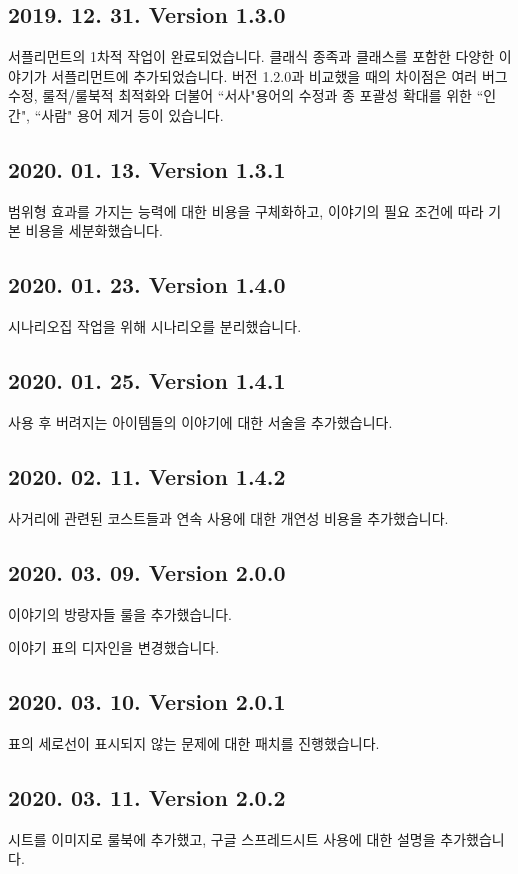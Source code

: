 \documentclass{report}
\begin{document}
	\subsection*{2019. 12. 31. Version 1.3.0}
	서플리먼트의 1차적 작업이 완료되었습니다. 클래식 종족과 클래스를 포함한 다양한 이야기가 서플리먼트에 추가되었습니다. 버전 1.2.0과 비교했을 때의 차이점은 여러 버그 수정, 룰적/룰북적 최적화와 더불어 ``서사"용어의 수정과 종 포괄성 확대를 위한 ``인간", ``사람" 용어 제거 등이 있습니다.
	
	\subsection*{2020. 01. 13. Version 1.3.1}
	범위형 효과를 가지는 능력에 대한 비용을 구체화하고, 이야기의 필요 조건에 따라 기본 비용을 세분화했습니다.
	
	\subsection*{2020. 01. 23. Version 1.4.0}
	시나리오집 작업을 위해 시나리오를 분리했습니다.
	
	\subsection*{2020. 01. 25. Version 1.4.1}
	사용 후 버려지는 아이템들의 이야기에 대한 서술을 추가했습니다.
	
	\subsection*{2020. 02. 11. Version 1.4.2}
	사거리에 관련된 코스트들과 연속 사용에 대한 개연성 비용을 추가했습니다.
	
	\subsection*{2020. 03. 09. Version 2.0.0}
	이야기의 방랑자들 룰을 추가했습니다.
	
	이야기 표의 디자인을 변경했습니다.
	
	\subsection*{2020. 03. 10. Version 2.0.1}
	표의 세로선이 표시되지 않는 문제에 대한 패치를 진행했습니다.
	
	\subsection*{2020. 03. 11. Version 2.0.2}
	시트를 이미지로 룰북에 추가했고, 구글 스프레드시트 사용에 대한 설명을 추가했습니다.
	
\end{document}
